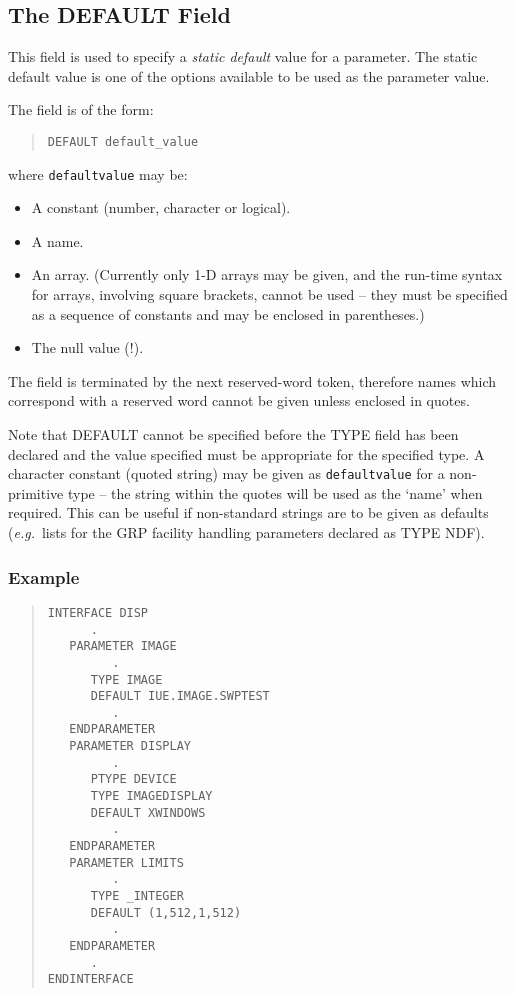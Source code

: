 \documentclass[twoside,11pt]{article}
\newcommand{\xlabel}[1]{}
\renewcommand{\_}{\texttt{\symbol{95}}}
\begin{document}
\subsection{The DEFAULT Field
\xlabel{the_default_field}\label{default}}

This field is used to specify a {\em static default} value for a parameter. 
The static default value is one of the options available to be used as the 
parameter value.

The field is of the form:
\begin{quote} \begin{verbatim}
DEFAULT default_value
\end{verbatim} \end{quote}
where \texttt{default\_value} may be:
\begin{itemize}
\item A constant (number, character or logical).
\item A name.
\item An array. (Currently only 1-D arrays may be given, and the run-time 
syntax for arrays, involving square brackets, cannot be used -- they must be 
specified as a sequence of constants and may be enclosed in parentheses.)
\item The null value (!).
\end{itemize}
The field is terminated by the next reserved-word token, therefore names which
correspond with a reserved word cannot be given unless enclosed in quotes.

Note that DEFAULT cannot be specified before the TYPE field has been declared 
and the value specified must be appropriate for the specified type. 
A character constant (quoted string) may be given as \texttt{default\_value} 
for a non-primitive type -- the string within the quotes will be used as the
`name' when required. This can be useful if non-standard strings are to be 
given as defaults ({\em e.g.}\ lists for the GRP facility handling parameters
declared as TYPE NDF).

\subsubsection*{Example}
\begin{quote} \begin{verbatim}
INTERFACE DISP
      .
   PARAMETER IMAGE
         .
      TYPE IMAGE
      DEFAULT IUE.IMAGE.SWPTEST
         .
   ENDPARAMETER
   PARAMETER DISPLAY
         .
      PTYPE DEVICE
      TYPE IMAGEDISPLAY
      DEFAULT XWINDOWS
         .
   ENDPARAMETER
   PARAMETER LIMITS
         .
      TYPE _INTEGER
      DEFAULT (1,512,1,512)
         .
   ENDPARAMETER
      .
ENDINTERFACE
\end{verbatim} \end{quote}
\end{document}
